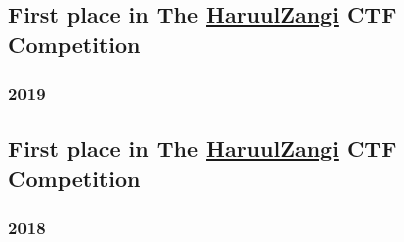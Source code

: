 \documentclass[a4]{article}
\begin{document}
\subsection{First place in The \href{http:www.haruulzangi.mn}{HaruulZangi} CTF Competition}
\label{sec:org539df24}
\subsubsection{2019}
\label{sec:org08c7b98}
\subsection{First place in The \href{http:www.haruulzangi.mn}{HaruulZangi} CTF Competition}
\label{sec:org0d044b3}
\subsubsection{2018}
\label{sec:orgeec605e}
\end{document}
